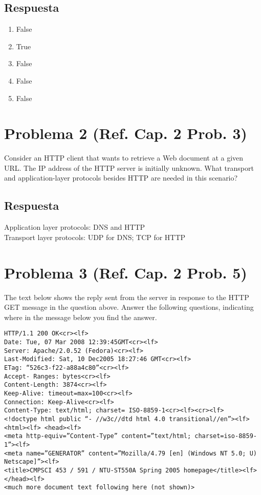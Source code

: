 \documentclass[10pt,spanish]{article}
\numberwithin{figure}{section} %
\begin{document}
\subsection*{Respuesta}

\begin{enumerate}
\item False
\item True
\item False
\item False
\item False
\end{enumerate}

\section[Problema 2]{Problema 2 \textnormal{\Large{(Ref. Cap. 2 Prob. 3)}}}

Consider an HTTP client that wants to retrieve a Web document at a given URL. The IP address of the HTTP server is initially unknown. What transport and application-layer protocols besides HTTP are needed in this scenario?

\subsection*{Respuesta}

Application layer protocols: DNS and HTTP\\
Transport layer protocols: UDP for DNS; TCP for HTTP

\newpage

\section[Problema 3]{Problema 3 \textnormal{\Large{(Ref. Cap. 2 Prob. 5)}}}

The text below shows the reply sent from the server in response to the HTTP GET message in the question above. Answer the following questions, indicating where in the message below you find the answer.

\begin{verbatim}
HTTP/1.1 200 OK<cr><lf>
Date: Tue, 07 Mar 2008 12:39:45GMT<cr><lf>
Server: Apache/2.0.52 (Fedora)<cr><lf>
Last-Modified: Sat, 10 Dec2005 18:27:46 GMT<cr><lf>
ETag: “526c3-f22-a88a4c80”<cr><lf>
Accept- Ranges: bytes<cr><lf>
Content-Length: 3874<cr><lf>
Keep-Alive: timeout=max=100<cr><lf>
Connection: Keep-Alive<cr><lf>
Content-Type: text/html; charset= ISO-8859-1<cr><lf><cr><lf>
<!doctype html public “- //w3c//dtd html 4.0 transitional//en”><lf><html><lf> <head><lf> 
<meta http-equiv=”Content-Type” content=”text/html; charset=iso-8859-1”><lf>
<meta name=”GENERATOR” content=”Mozilla/4.79 [en] (Windows NT 5.0; U) Netscape]”><lf>
<title>CMPSCI 453 / 591 / NTU-ST550A Spring 2005 homepage</title><lf></head><lf> 
<much more document text following here (not shown)>
\end{verbatim}
\end{document}
